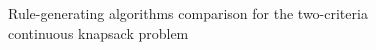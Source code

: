\begin{figure}
  \centering
  \caption{Rule-generating algorithms comparison for the two-criteria continuous knapsack problem}
  \label{c2_cont_algo}
\end{figure}

